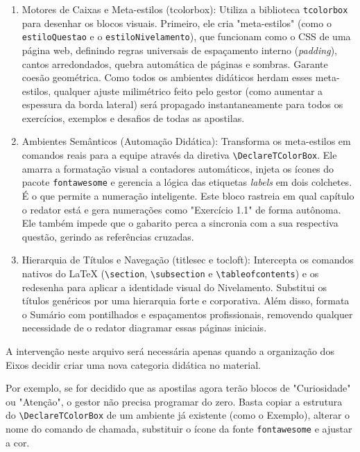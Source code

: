 \begin{enumerate}
    \item Motores de Caixas e Meta-estilos (tcolorbox): Utiliza a biblioteca \texttt{tcolorbox} para desenhar os blocos visuais. Primeiro, ele cria "meta-estilos" (como o \texttt{estiloQuestao} e o \texttt{estiloNivelamento}), que funcionam como o CSS de uma página web, definindo regras universais de espaçamento interno (\textit{padding}), cantos arredondados, quebra automática de páginas e sombras. Garante coesão geométrica. Como todos os ambientes didáticos herdam esses meta-estilos, qualquer ajuste milimétrico feito pelo gestor (como aumentar a espessura da borda lateral) será propagado instantaneamente para todos os exercícios, exemplos e desafios de todas as apostilas.

    \item Ambientes Semânticos (Automação Didática): Transforma os meta-estilos em comandos reais para a equipe através da diretiva \verb|\DeclareTColorBox|. Ele amarra a formatação visual a contadores automáticos, injeta os ícones do pacote \texttt{fontawesome} e gerencia a lógica das etiquetas \textit{labels} em dois colchetes. É o que permite a numeração inteligente. Este bloco rastreia em qual capítulo o redator está e gera numerações como "Exercício 1.1" de forma autônoma. Ele também impede que o gabarito perca a sincronia com a sua respectiva questão, gerindo as referências cruzadas.

    \item Hierarquia de Títulos e Navegação (titlesec e tocloft): Intercepta os comandos nativos do LaTeX (\verb|\section|, \verb|\subsection| e \verb|\tableofcontents|) e os redesenha para aplicar a identidade visual do Nivelamento. Substitui os títulos genéricos por uma hierarquia forte e corporativa. Além disso, formata o Sumário com pontilhados e espaçamentos profissionais, removendo qualquer necessidade de o redator diagramar essas páginas iniciais.
\end{enumerate}

A intervenção neste arquivo será necessária apenas quando a organização dos Eixos decidir criar uma nova categoria didática no material. 

Por exemplo, se for decidido que as apostilas agora terão blocos de "Curiosidade" ou "Atenção", o gestor não precisa programar do zero. Basta copiar a estrutura do \verb|\DeclareTColorBox| de um ambiente já existente (como o Exemplo), alterar o nome do comando de chamada, substituir o ícone da fonte \texttt{fontawesome} e ajustar a cor.

